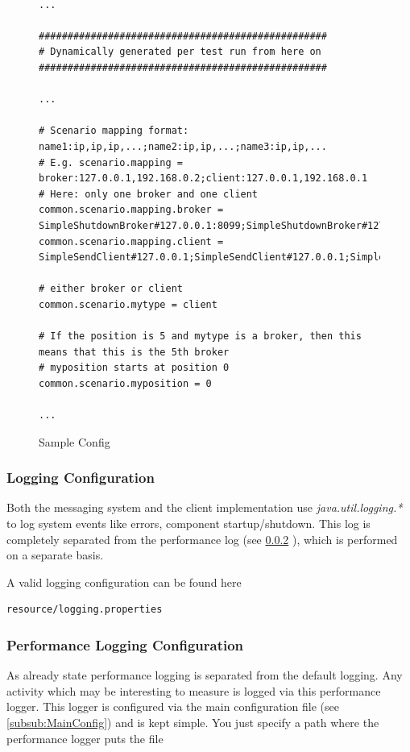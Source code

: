 \documentclass[a4paper]{article}
\begin{document}
\begin{figure}[H]
\begin{verbatim} 

...

##################################################
# Dynamically generated per test run from here on
##################################################

...

# Scenario mapping format: name1:ip,ip,ip,...;name2:ip,ip,...;name3:ip,ip,...
# E.g. scenario.mapping = broker:127.0.0.1,192.168.0.2;client:127.0.0.1,192.168.0.1
# Here: only one broker and one client
common.scenario.mapping.broker = SimpleShutdownBroker#127.0.0.1:8099;SimpleShutdownBroker#127.0.0.1:8100,127.0.0.1:8101
common.scenario.mapping.client = SimpleSendClient#127.0.0.1;SimpleSendClient#127.0.0.1;SimpleSendClient#127.0.0.1;SimpleSendClient#127.0.0.1,127.0.0.1

# either broker or client
common.scenario.mytype = client

# If the position is 5 and mytype is a broker, then this means that this is the 5th broker
# myposition starts at position 0
common.scenario.myposition = 0

...

\end{verbatim}
\caption{Sample Config}
\label{fig:SampleConfig}
\end{figure}  	

\subsubsection{Logging Configuration}
\label{subsub:loggingConfig}
Both the messaging system and the client implementation use \textit{java.util.logging.*} to log system events like errors, component startup/shutdown. This log is completely separated from the performance log (see \ref{subsub:PerfLogConfig} ), which is performed on a separate basis.

A valid logging configuration can be found here

\begin{verbatim} 
resource/logging.properties
\end{verbatim}

\subsubsection{Performance Logging Configuration}
\label{subsub:PerfLogConfig}

As already state performance logging is separated from the default logging. Any activity which may be interesting to measure is logged via this performance logger. This logger is configured via the main configuration file (see \ref{subsub:MainConfig}) and is kept simple. You just specify a path where the performance logger puts the file
\end{document}
